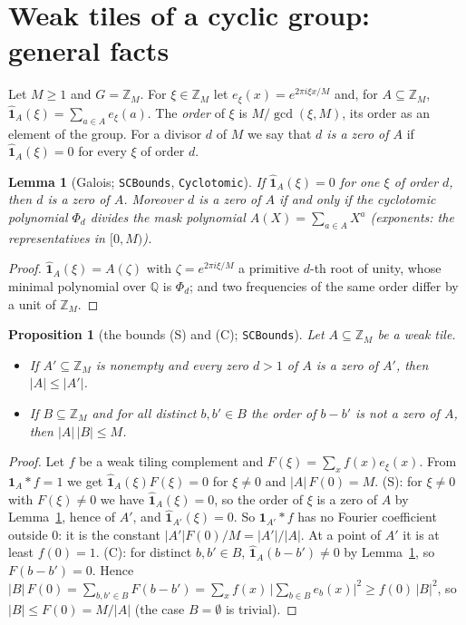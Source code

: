 \documentclass[11pt,a4paper]{amsart}
\newtheorem{proposition}[theorem]{Proposition}
\newtheorem{lemma}[theorem]{Lemma}
\theoremstyle{definition}
\theoremstyle{remark}
\newcommand{\Z}{\mathbb{Z}}
\newcommand{\Q}{\mathbb{Q}}
\newcommand{\one}{\mathbf{1}}
\newcommand{\lean}[1]{\texttt{#1}}
\begin{document}
\section{Weak tiles of a cyclic group: general facts}\label{N:sec:general}

Let $M\ge 1$ and $G=\Z_M$. For $\xi\in\Z_M$ let $e_\xi(x)=e^{2\pi i\xi x/M}$ and, for $A\subseteq\Z_M$,
$\hat{\one}_A(\xi)=\sum_{a\in A}e_\xi(a)$. The \emph{order} of $\xi$ is $M/\gcd(\xi,M)$, its order as an element
of the group. For a divisor $d$ of $M$ we say that \emph{$d$ is a zero of $A$} if $\hat{\one}_A(\xi)=0$ for
every $\xi$ of order $d$.

\begin{lemma}[Galois; \lean{SCBounds}, \lean{Cyclotomic}]\label{N:lem:gal}
If $\hat{\one}_A(\xi)=0$ for one $\xi$ of order $d$, then $d$ is a zero of $A$. Moreover $d$ is a zero of $A$ if
and only if the cyclotomic polynomial $\Phi_d$ divides the mask polynomial $A(X)=\sum_{a\in A}X^a$ (exponents: the
representatives in $[0,M)$).
\end{lemma}
\begin{proof}
$\hat{\one}_A(\xi)=A(\zeta)$ with $\zeta=e^{2\pi i\xi/M}$ a primitive $d$-th root of unity, whose minimal
polynomial over $\Q$ is $\Phi_d$; and two frequencies of the same order differ by a unit of $\Z_M$.
\end{proof}

\begin{proposition}[the bounds (S) and (C); \lean{SCBounds}]\label{N:prop:SC}
Let $A\subseteq\Z_M$ be a weak tile.
\begin{itemize}
\item[\textup{(S)}] If $A'\subseteq\Z_M$ is nonempty and every zero $d>1$ of $A$ is a zero of $A'$, then $|A|\le|A'|$.
\item[\textup{(C)}] If $B\subseteq\Z_M$ and for all distinct $b,b'\in B$ the order of $b-b'$ is not a zero of $A$, then
 $|A|\,|B|\le M$.
\end{itemize}
\end{proposition}
\begin{proof}
Let $f$ be a weak tiling complement and $F(\xi)=\sum_xf(x)e_\xi(x)$. From $\one_A*f=1$ we get
$\hat{\one}_A(\xi)F(\xi)=0$ for $\xi\ne0$ and $|A|\,F(0)=M$. (S): for $\xi\ne 0$ with $F(\xi)\ne0$ we have
$\hat{\one}_A(\xi)=0$, so the order of $\xi$ is a zero of $A$ by Lemma~\ref{N:lem:gal}, hence of $A'$, and
$\hat{\one}_{A'}(\xi)=0$. So $\one_{A'}*f$ has no Fourier coefficient outside $0$: it is the constant
$|A'|F(0)/M=|A'|/|A|$. At a point of $A'$ it is at least $f(0)=1$. (C): for distinct $b,b'\in B$,
$\hat{\one}_A(b-b')\ne0$ by Lemma~\ref{N:lem:gal}, so $F(b-b')=0$. Hence
$|B|\,F(0)=\sum_{b,b'\in B}F(b-b')=\sum_xf(x)\,\bigl|\sum_{b\in B}e_b(x)\bigr|^2\ge f(0)\,|B|^2$, so
$|B|\le F(0)=M/|A|$ (the case $B=\emptyset$ is trivial).
\end{proof}
\end{document}
